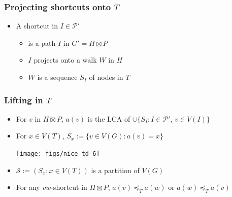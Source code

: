 \documentclass[xcolor=dvipsnames]{beamer}
\begin{document}
\begin{frame}
  \frametitle{Projecting shortcuts onto $T$}

  \begin{itemize}
    \item A shortcut in $I\in\mathcal{P'}$
    \begin{itemize}
      \item<2-> is a path $I$ in $G'=H\boxtimes P$
      \item<3-> $I$ projects onto a walk $W$ in $H$
      \item<4-> $W$ is a sequence $S_I$ of nodes in $T$
    \end{itemize}
  \end{itemize}
  \begin{center}
  \end{center}
\end{frame}

\begin{frame}
  \frametitle{Lifting in $T$}
  \begin{itemize}
    \item For $v$ in $H\boxtimes P$, $a(v)$ is the LCA of $\cup\{S_I:I\in\mathcal{P'},\, v\in V(I)\}$
    \item For $x\in V(T)$, $S_x:=\{v\in V(G): a(v)=x\}$
    \begin{center}
      \texttt{[image: figs/nice-td-6]}%
    \end{center}
    \item<2-> $\mathcal{S}:=(S_x:x\in V(T))$ is a partition of $V(G)$
    \item<3->[$(\star)$] For any $vw$-shortcut in $H\boxtimes P$, $a(v)\preceq_T a(w)$ or $a(w)\preceq_T a(v)$
\end{itemize}
\end{frame}
\end{document}
